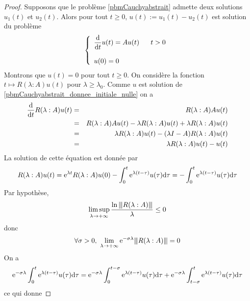 \begin{proof}
    Supposons que le problème \eqref{pbmCauchyabstrait} admette deux solutions $u_1(t)$ et $u_2(t)$. Alors pour tout $t \geq 0$, $u(t):=u_1(t)-u_2(t)$ est solution du problème 
    \begin{equation}\label{pbmCauchyabstrait_donnee_initiale_nulle}
        \left\{\begin{array}{l}
            \dfrac{\mathrm{d}}{\mathrm{d} t}u(t) = Au(t) \ \ \ \ \ t >0 \\
            \\
            u(0)=0
        \end{array}\right.
    \end{equation}
    Montrons que $u(t) = 0$ pour tout $t \geq 0$. On considère la fonction $t \mapsto R(\lambda : A)u(t)$ pour $\lambda \geq \lambda_0$. Comme $u$ est solution de \eqref{pbmCauchyabstrait_donnee_initiale_nulle} on a 
    \begin{eqnarray*}
        \frac{\mathrm{d}}{\mathrm{d} t}R(\lambda : A)u(t) &=& R(\lambda : A)Au(t) \\
        &=& R(\lambda :A)Au(t)-\lambda R(\lambda : A)u(t) + \lambda R(\lambda : A)u(t) \\
        &=& \lambda R(\lambda : A)u(t)-(\lambda I-A)R(\lambda : A)u(t) \\
        &=& \lambda R(\lambda : A)u(t)-u(t)
    \end{eqnarray*}
    La solution de cette équation est donnée par 
    \begin{equation*}
        R(\lambda : A)u(t) = \mathrm{e}^{\lambda t}R(\lambda : A)u(0)-\int_0^t\mathrm{e}^{\lambda(t-\tau)}u(\tau)\mathrm{d} \tau = -\int_0^t\mathrm{e}^{\lambda(t-\tau)}u(\tau)\mathrm{d} \tau 
    \end{equation*}
    Par hypothèse,
    \begin{equation*}
        \limsup_{\lambda \to +\infty} \frac{\ln{\left\vert\kern-0.25ex\left\vert \kern-0.25ex\left\vert R(\lambda:A) \right\vert\kern-0.25ex\right\vert\kern-0.25ex\right\vert}}{\lambda} \leq 0
    \end{equation*}
    donc 
    \begin{equation*}
        \forall \sigma >0, \ \lim_{\lambda \to +\infty}\mathrm{e}^{-\sigma \lambda}{\left\vert\kern-0.25ex\left\vert \kern-0.25ex\left\vert R(\lambda :A) \right\vert\kern-0.25ex\right\vert\kern-0.25ex\right\vert}=0
    \end{equation*}
    On a 
    \begin{eqnarray*}
        \mathrm{e}^{-\sigma \lambda}\int_0^t\mathrm{e}^{\lambda(t-\tau)}u(\tau)\mathrm{d} \tau = \mathrm{e}^{-\sigma \lambda}\int_0^{t-\sigma}\mathrm{e}^{\lambda(t-\tau)}u(\tau)\mathrm{d} \tau + \mathrm{e}^{-\sigma \lambda}\int_{t-\sigma}^t \mathrm{e}^{\lambda(t-\tau)}u(\tau)\mathrm{d} \tau
    \end{eqnarray*}
    ce qui donne 

\end{proof}
